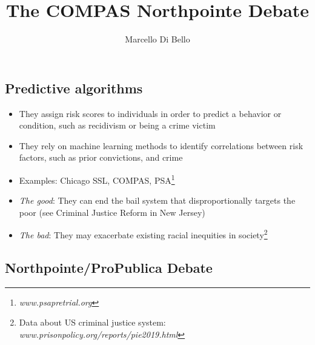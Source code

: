 \documentclass{tufte-handout}
\title{ \sc The COMPAS Northpointe Debate}
\author[Marcello Di Bello]{Marcello Di Bello}
\date{} %
\begin{document}
\maketitle

\subsection{Predictive algorithms}

\begin{itemize}

 \item[] They assign risk scores to individuals in order to predict a behavior or condition, such as recidivism or being a crime victim 
 
\item[] They rely on machine learning methods to identify correlations between risk factors, such as prior convictions, and crime 

\item[] Examples: Chicago SSL,  COMPAS, PSA\footnote{\textit{www.psapretrial.org}}

 \item[] \textit{The good}: They can end the bail system that disproportionally targets the poor  (see Criminal Justice Reform in New Jersey)

\item[] \textit{The bad}:  They may exacerbate existing racial inequities in society\footnote{Data about US criminal justice system: \textit{www.prisonpolicy.org/reports/pie2019.html}}

\end{itemize}

 


\subsection{Northpointe/ProPublica Debate}
\end{document}
